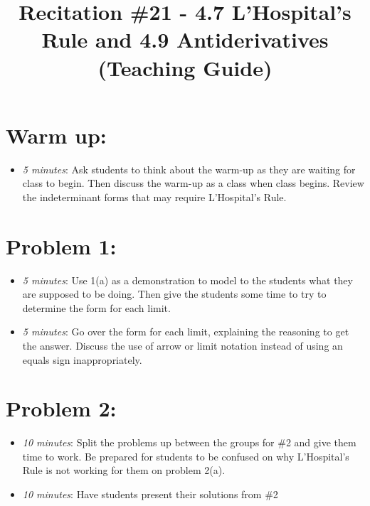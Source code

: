 \documentclass[handout,nooutcomes]{ximera}
\title{Recitation \#21 - 4.7 L'Hospital's Rule and 4.9 Antiderivatives (Teaching Guide)}
\begin{document}
\begin{abstract}		\end{abstract}
\maketitle


\section*{Warm up:} 
	
	\begin{itemize}
	
	\item  \emph{5 minutes}:  Ask students to think about the warm-up as they are waiting for class to begin.  
	Then discuss the warm-up as a class when class begins.  
	Review the indeterminant forms that may require L'Hospital's Rule.
	
	
	
	\end{itemize}


\section*{Problem 1:}

	\begin{itemize}
	
	\item  \emph{5 minutes}:  Use 1(a) as a demonstration to model to the students what they are supposed to be doing.  Then give the students some time to try to determine the form for each limit.
	
	\item  \emph{5 minutes}:  Go over the form for each limit, explaining the reasoning to get the answer. Discuss the use of arrow or limit notation instead of using an equals sign inappropriately.  
	
	\end{itemize}



\section*{Problem 2:}

	\begin{itemize}
	
	\item  \emph{10 minutes}:  Split the problems up between the groups for \#2 and give them time to work.  Be prepared for students to be confused on why L'Hospital's Rule is not working for them on problem 2(a).
		
	\item  \emph{10 minutes}:  Have students present their solutions from \#2
			
	\end{itemize}
	
\end{document}
